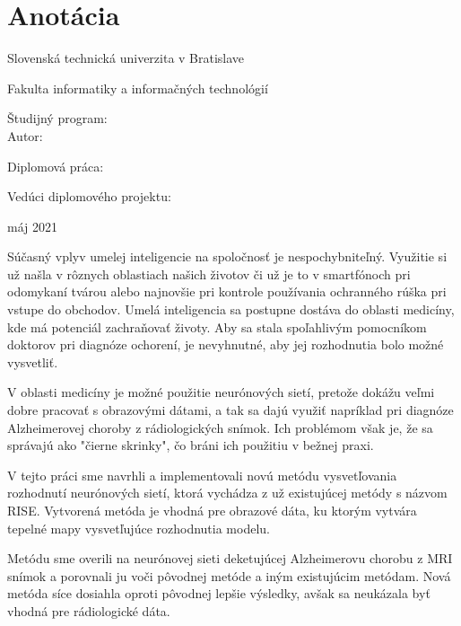 
\thispagestyle{empty}
\section*{Anotácia}

\begin{minipage}[t]{1\columnwidth}%
Slovenská technická univerzita v Bratislave

Fakulta informatiky a informačných technológií

Študijný program: \myStudyProgram\\

Autor: \myName

Diplomová práca: \myTitle

Vedúci diplomového projektu: \mySupervisor

máj 2021
\end{minipage}

\bigskip{}

Súčasný vplyv umelej inteligencie na spoločnosť je nespochybniteľný. Využitie si už našla v rôznych oblastiach našich životov či už je to v smartfónoch pri odomykaní tvárou alebo najnovšie pri kontrole používania ochranného rúška pri vstupe do obchodov. Umelá inteligencia sa postupne dostáva do oblasti medicíny, kde má potenciál zachraňovať životy. Aby sa stala spoľahlivým pomocníkom doktorov pri diagnóze ochorení, je nevyhnutné, aby jej rozhodnutia bolo možné vysvetliť. 

V oblasti medicíny je možné použitie neurónových sietí, pretože dokážu veľmi dobre pracovať s obrazovými dátami, a tak sa dajú využiť napríklad pri diagnóze Alzheimerovej choroby z rádiologických snímok. Ich problémom však je, že sa správajú ako "čierne skrinky", čo bráni ich použitiu v bežnej praxi.

V tejto práci sme navrhli a implementovali novú metódu vysvetľovania rozhodnutí neurónových sietí, ktorá vychádza z už existujúcej metódy s názvom RISE. Vytvorená metóda je vhodná pre obrazové dáta, ku ktorým vytvára tepelné mapy vysvetľujúce rozhodnutia modelu.

Metódu sme overili na neurónovej sieti deketujúcej Alzheimerovu chorobu z MRI snímok a porovnali ju voči pôvodnej metóde a iným existujúcim metódam. Nová metóda síce dosiahla oproti pôvodnej lepšie výsledky, avšak sa neukázala byť vhodná pre rádiologické dáta.

\newpage
\thispagestyle{empty}
\mbox{}
\newpage